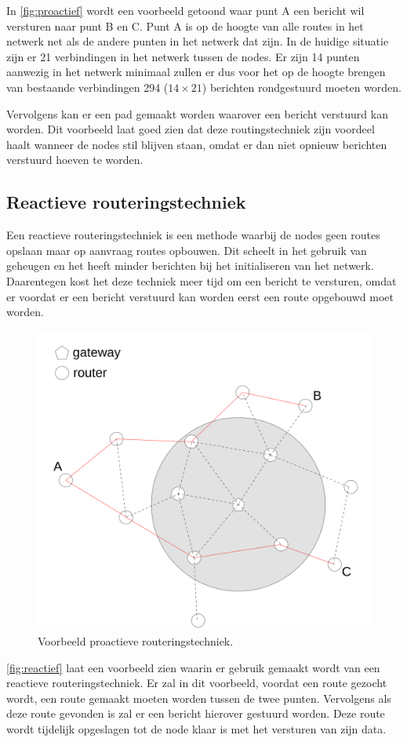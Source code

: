 \documentclass[a4paper, 11pt, oneside]{report}
\begin{document}
In \autoref{fig:proactief} wordt een voorbeeld getoond waar punt A een bericht wil versturen naar punt B en C. 
Punt A is op de hoogte van alle routes in het netwerk net als de andere punten in het netwerk dat zijn.
In de huidige situatie zijn er 21 verbindingen in het netwerk tussen de nodes.
Er zijn 14 punten aanwezig in het netwerk minimaal zullen er dus voor het op de hoogte brengen van bestaande verbindingen 294 ($14 \times 21$) berichten rondgestuurd moeten worden. 

Vervolgens kan er een pad gemaakt worden waarover een bericht verstuurd kan worden.
Dit voorbeeld laat goed zien dat deze routingstechniek zijn voordeel haalt wanneer de nodes stil blijven staan, omdat er dan niet opnieuw berichten verstuurd hoeven te worden. 
 
\subsection{Reactieve routeringstechniek}
\label{sec:meshnetwerktechniek:reactieve}

Een reactieve routeringstechniek is een methode waarbij de nodes geen routes opslaan maar op aanvraag routes opbouwen. 
Dit scheelt in het gebruik van geheugen en het heeft minder berichten bij het initialiseren van het netwerk. Daarentegen kost het deze techniek meer tijd om een bericht te versturen, omdat er voordat er een bericht verstuurd kan worden eerst een route opgebouwd moet worden.

\begin{figure}[H]
	\begin{center}\includegraphics[width=0.45\linewidth]{Afbeeldingen/reactive.png}\end{center}
	\caption{Voorbeeld proactieve routeringstechniek.}
	\label{fig:reactief}
\end{figure}

\autoref{fig:reactief} laat een voorbeeld zien waarin er gebruik gemaakt wordt van een reactieve routeringstechniek.
Er zal in dit voorbeeld, voordat een route gezocht wordt, een route gemaakt moeten worden tussen de twee punten.
Vervolgens als deze route gevonden is zal er een bericht hierover gestuurd worden. 
Deze route wordt tijdelijk opgeslagen tot de node klaar is met het versturen van zijn data.
\end{document}
